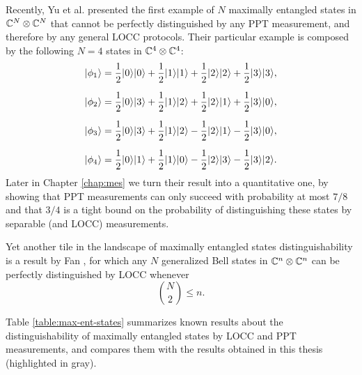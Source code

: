 Recently, Yu et al. \cite{Yu12} presented the first example of $N$ maximally 
entangled states in $\mathbb{C}^{N}\otimes\mathbb{C}^{N}$ that cannot be 
perfectly distinguished by any PPT measurement, and therefore by any general 
LOCC protocols.
Their particular example is composed by the following $N = 4$ states in 
$\mathbb{C}^{4}\otimes\mathbb{C}^{4}$:
\begin{equation}
  \label{eq:ydy_states}
  \begin{aligned}
    \ket{\phi_1} & =
    \frac{1}{2} \ket{0}\ket{0} + 
    \frac{1}{2} \ket{1}\ket{1} + 
    \frac{1}{2} \ket{2}\ket{2} + 
    \frac{1}{2} \ket{3}\ket{3}, \\[2mm]
    \ket{\phi_2} & =
    \frac{1}{2} \ket{0}\ket{3} + 
    \frac{1}{2} \ket{1}\ket{2} + 
    \frac{1}{2} \ket{2}\ket{1} + 
    \frac{1}{2} \ket{3}\ket{0}, \\[2mm]
    \ket{\phi_3} & =
    \frac{1}{2} \ket{0}\ket{3} +
    \frac{1}{2} \ket{1}\ket{2} - 
    \frac{1}{2} \ket{2}\ket{1} - 
    \frac{1}{2} \ket{3}\ket{0}, \\[2mm]
    \ket{\phi_4} & =
    \frac{1}{2} \ket{0}\ket{1} + 
    \frac{1}{2} \ket{1}\ket{0} -
    \frac{1}{2} \ket{2}\ket{3} - 
    \frac{1}{2} \ket{3}\ket{2}.
  \end{aligned}
\end{equation}
Later in Chapter \ref{chap:mes} we turn their result into a quantitative one,
by showing that PPT measurements can only succeed with probability at most $7/8$
and that $3/4$ is a tight bound on the probability of distinguishing these states 
by separable (and LOCC) measurements.

Yet another tile in the landscape of maximally entangled states distinguishability
is a result by Fan \cite{Fan04}, for which any $N$ generalized 
Bell states in $\mathbb{C}^{n}\otimes\mathbb{C}^{n}$ can be perfectly distinguished 
by LOCC whenever 
\[ 
  \binom{N}{2}\leq n.
\]

Table \ref{table:max-ent-states} summarizes known results about the
distinguishability of maximally entangled states by LOCC and PPT 
measurements, and compares them with the results obtained in this thesis 
(highlighted in gray). 

